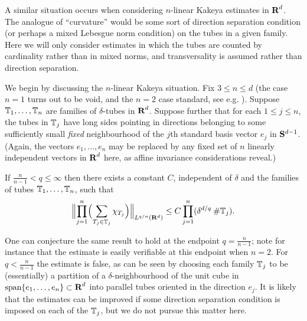 A similar situation occurs when considering $n$-linear Kakeya estimates in ${\hbox{\bf R}}^d$.  The analogue of
``curvature'' would be some sort of direction separation condition (or perhaps a mixed Lebesgue
norm condition) on the tubes in a given family.  Here we will only consider estimates
in which the tubes are counted by cardinality rather than in mixed norms,
and transversality is assumed rather than direction separation.

We begin by discussing the $n$-linear Kakeya situation.
Fix $3 \leq n \leq d$ (the case $n=1$ turns out to be void, and the $n=2$ case standard, see e.g. \cite{TVV}).
Suppose ${\mathbb{T}}_{1},\hdots,{\mathbb{T}}_{n}$ are families of
$\delta$-tubes in ${\hbox{\bf R}}^d$. Suppose further that for each $1\leq
j\leq n$, the tubes in ${\mathbb{T}}_{j}$ have long sides pointing in
directions belonging to some sufficiently small \textit{fixed}
neighbourhood of the $j$th standard basis vector $e_{j}$ in ${\bf
S}^{d-1}$.
(Again, the vectors $e_{1},\hdots,e_{n}$ may be replaced by any
fixed set of $n$ linearly independent vectors in ${\hbox{\bf R}}^d$ here, as
affine invariance considerations reveal.)
\begin{theorem}\label{nlinrd}
If $\tfrac{n}{n-1}<q\leq\infty$ then there exists a constant $C$,
independent of $\delta$ and the families of tubes
${\mathbb{T}}_{1},\hdots,{\mathbb{T}}_{n}$, such that
\begin{equation}\label{mkn}
\Bigl\|\prod_{j=1}^{n}\Bigl(\sum_{T_{j}\in{\mathbb{T}}_{j}}\chi_{T_{j}}\Bigr)\Bigr\|_{L^{q/n}({\bf
R}^d)}\leq C\prod_{j=1}^{n}(\delta^{d/q}\: \mbox{\#}{\mathbb{T}}_{j}).
\end{equation}
\end{theorem}
\begin{remark} One can conjecture the same result to hold at the endpoint $q=\tfrac{n}{n-1}$; note for instance
that the estimate is easily verifiable at this endpoint when $n=2$.
For $q < \tfrac{n}{n-1}$ the estimate is false, as can be seen by choosing each family
${\mathbb{T}}_{j}$ to be (essentially) a partition of a $\delta$-neighbourhood of the
unit cube in $\mbox{span}\{e_{1},\hdots,e_{n}\}\subset{\hbox{\bf R}}^{d}$ into parallel tubes oriented in the direction $e_j$.
It is likely that the estimates can be improved if some direction separation condition is imposed on each of the ${\mathbb{T}}_j$, but
we do not pursue this matter here.
\end{remark}

